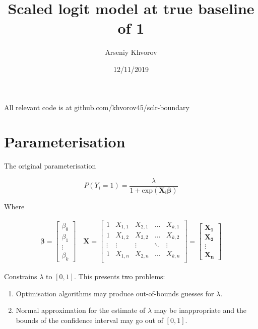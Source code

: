\documentclass[
]{article}
\title{Scaled logit model at true baseline of 1}
\author{Arseniy Khvorov}
\date{12/11/2019}
\begin{document}
\maketitle

All relevant code is at github.com/khvorov45/sclr-boundary

\hypertarget{parameterisation}{%
\section{Parameterisation}\label{parameterisation}}

The original parameterisation

\begin{equation}
  P(Y_i=1)=\frac{\lambda}{1 + \text{exp}(\boldsymbol{\boldsymbol{X_i}\beta})} 
  \label{eq:binom}
\end{equation}

Where

\begin{align*}
  \boldsymbol{\beta} =
    \begin{bmatrix}
    \beta_0 \\
    \beta_1 \\
    \vdots \\
    \beta_k
    \end{bmatrix}
\quad
  \boldsymbol{X} =
    \begin{bmatrix}
    1 & X_{1, 1} & X_{2, 1} & \ldots & X_{k, 1} \\
    1 & X_{1, 2} & X_{2, 2} & \ldots & X_{k, 2} \\
    \vdots & \vdots & \vdots & \ddots & \vdots \\
    1 & X_{1, n} & X_{2, n} & \ldots & X_{k, n} \\
    \end{bmatrix}
= 
    \begin{bmatrix}
    \boldsymbol{X_1} \\
    \boldsymbol{X_2} \\
    \vdots \\
    \boldsymbol{X_n}
    \end{bmatrix}
\end{align*}

Constrains \(\lambda\) to \([0, 1]\). This presents two problems:

\begin{enumerate}
\def\labelenumi{\arabic{enumi}.}
\item
  Optimisation algorithms may produce out-of-bounds guesses for \(\lambda\).
\item
  Normal approximation for the estimate of \(\lambda\) may be inappropriate and the bounds of the confidence interval may go out of \([0, 1]\).
\end{enumerate}
\end{document}
